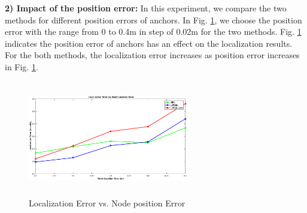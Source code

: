 \textbf{2) Impact of the position error:}
 In this experiment, we compare the two methods for different position errors of anchors. 
 In Fig. \ref{fig5}, we choose the position error with the range from 0 to 0.4m in step of 0.02m for the two methods. 
 Fig. \ref{fig5} indicates the position error of anchors has an effect on the localization results. 
 For the both methods, the localization error increases as position error increases in Fig. \ref{fig5}. 
  \begin{figure}[htb]
		   \vspace{-25mm}
			 \includegraphics[height=5.0cm,width=7.0cm]{image/locationerror.eps}
            \vspace{25mm}
            \caption{Localization Error vs. Node position Error}
             \vspace{-5mm}
             \label{fig5}
        \end{figure}

